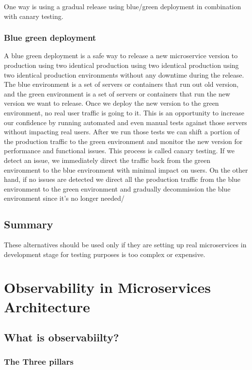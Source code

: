 One way is using a gradual release using blue/green deployment in combination with canary testing.

\subsubsection{Blue green deployment}
A blue green deployment is a safe way to release a new microservice version to production using two identical production using two identical production using two identical production environments without any downtime during the release.
The blue environment is a set of servers or containers that run out old version, and the green environment is a set of servers or containers that run the new version we want to release.
Once we deploy the new version to the green environment, no real user traffic is going to it.
This is an opportunity to increase our confidence by running automated and even manual tests against those servers without impacting real users.
After we run those tests we can shift a portion of the production traffic to the green environment and monitor the new version for performance and functional issues.
This process is called canary testing.
If we detect an issue, we immediately direct the traffic back from the green environment to the blue environment with minimal impact on users.
On the other hand, if no issues are detected we direct all the production traffic from the blue environment to the green environment and gradually decommission the blue environment since it's no longer needed/

\subsection{Summary}

These alternatives should be used only if they are setting up real microservices in development stage for testing purposes is too complex or expensive.


\section{Observability in Microservices Architecture}

\subsection{What is observabiilty?}

\subsubsection{The Three pillars}

